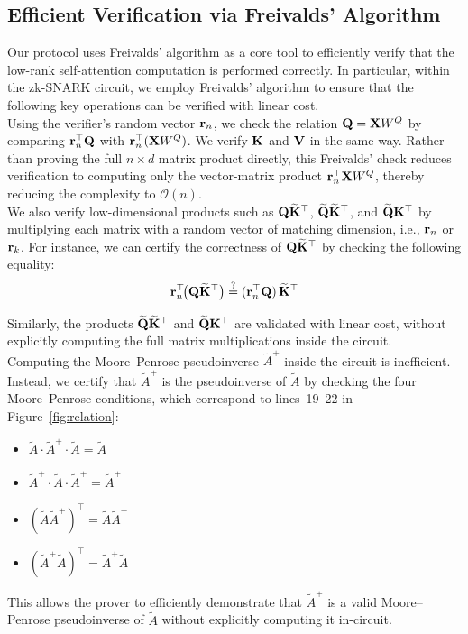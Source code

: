 \documentclass[letterpaper,twocolumn,10pt]{article}
\begin{document}
\subsection{Efficient Verification via Freivalds’ Algorithm}
Our protocol uses Freivalds’ algorithm as a core tool to efficiently verify that the low-rank self-attention computation is performed correctly. In particular, within the zk-SNARK circuit, we employ Freivalds’ algorithm to ensure that the following key operations can be verified with linear cost. \\

Using the verifier's random vector ${\mathbf{r}}_n$, we check the relation ${\mathbf{Q}} = {\mathbf{X}} W^Q$ by comparing ${\mathbf{r}}_n^{\top} {\mathbf{Q}}$ with ${\mathbf{r}}_n^{\top}({\mathbf{X}} W^Q)$.
We verify ${\mathbf{K}}$ and ${\mathbf{V}}$ in the same way. Rather than proving the full $n\times d$ matrix product directly, this Freivalds' check reduces verification to computing only the vector-matrix product ${\mathbf{r}}_n^{\top}{\mathbf{X}} W^Q$, thereby reducing the complexity to $\mathcal{O}(n)$. \\

We also verify low-dimensional products such as ${\mathbf{Q}}\widetilde{{\mathbf{K}}}^{\top}$,
$\widetilde{{\mathbf{Q}}}\widetilde{{\mathbf{K}}}^{\top}$, and $\widetilde{{\mathbf{Q}}}{\mathbf{K}}^{\top}$
by multiplying each matrix with a random vector of matching dimension,
i.e., ${\mathbf{r}}_n$ or ${\mathbf{r}}_k$.
For instance, we can certify the correctness of ${\mathbf{Q}}\widetilde{{\mathbf{K}}}^{\top}$ by checking the following equality:
\[
{\mathbf{r}}_n^{\top}\!\bigl({\mathbf{Q}}\widetilde{{\mathbf{K}}}^{\top}\bigr)
\stackrel{?}{=}
({\mathbf{r}}_n^{\top}{\mathbf{Q}})\,\widetilde{{\mathbf{K}}}^{\top}
\]

Similarly, the products $\widetilde{{\mathbf{Q}}}\widetilde{{\mathbf{K}}}^{\top}$ and $\widetilde{{\mathbf{Q}}}{\mathbf{K}}^{\top}$ are validated with linear cost, without explicitly computing the full matrix multiplications inside the circuit. \\

Computing the Moore--Penrose pseudoinverse $\tilde{A}^{+}$ inside the circuit is inefficient.
Instead, we certify that $\tilde{A}^{+}$ is the pseudoinverse of $\tilde{A}$ by checking the four
Moore--Penrose conditions, which correspond to lines~19--22 in Figure~\ref{fig:relation}:
\begin{itemize}
    \item $\tilde{A}\cdot\tilde{A}^{+}\cdot\tilde{A}=\tilde{A}$
    \item $\tilde{A}^{+}\cdot\tilde{A}\cdot\tilde{A}^{+}=\tilde{A}^{+}$
    \item $(\tilde{A}\tilde{A}^{+})^{\top}=\tilde{A}\tilde{A}^{+}$
    \item $(\tilde{A}^{+}\tilde{A})^{\top}=\tilde{A}^{+}\tilde{A}$
\end{itemize}
This allows the prover to efficiently demonstrate that $\tilde{A}^{+}$ is a valid Moore--Penrose pseudoinverse of $\tilde{A}$ without explicitly computing it in-circuit.
\end{document}
